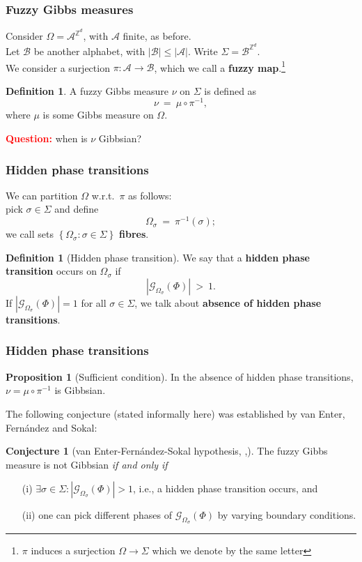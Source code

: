 \documentclass{beamer}
\newcommand{\A}{\mathcal{A}}
\newcommand{\B}{\mathcal{B}}
\newcommand{\G}{\mathcal{G}}
\newcommand{\Z}{\mathbb{Z}}
\newcommand{\set}[1]{\left\{#1\right\}}
\newcommand{\ra}{\rightarrow}
\newcommand{\1}{\mathbbm{1}}
\newcommand{\5}{\vspace{0.5cm}}
\newcommand{\3}{\vspace{0.3cm}}
\theoremstyle{definition}
\newtheorem{prop}[thm]{Proposition}
\newtheorem{df}[thm]{Definition}
\newtheorem*{conj}{Conjecture}
\begin{document}
\begin{frame}
\frametitle{Fuzzy Gibbs measures}
Consider $\Omega=\A^{\Z^d}$, with $\A$ finite, as before. \\\vspace{0.5cm}
Let $\B$ be another alphabet, with $|\B|\leq|\A|$. Write $\Sigma=\B^{\Z^d}$. \\\vspace{0.5cm}
We consider a surjection $\pi:\A\ra\B$, which we call a \textbf{fuzzy map}.\footnote{$\pi$ induces a surjection $\Omega\ra\Sigma$ which we denote by the same letter}
\begin{df}
A fuzzy Gibbs measure $\nu$ on $\Sigma$ is defined as
$$\nu ~=~ \mu\circ\pi^{-1},$$
where $\mu$ is some Gibbs measure on $\Omega$.
\end{df}\vspace{0.2cm}
\textcolor{red}{\textbf{Question:}} when is $\nu$ Gibbsian?
\end{frame}


\begin{frame}
\frametitle{Hidden phase transitions}
We can partition $\Omega$ w.r.t.~$\pi$ as follows:\\\vspace{0.3cm}
pick $\sigma\in\Sigma$ and define
$$\Omega_\sigma ~=~ \pi^{-1}(\sigma);$$
we call sets $\set{\Omega_\sigma:\sigma\in\Sigma}$ \textbf{fibres}.
\begin{df}[Hidden phase transition]
We say that a \textbf{hidden phase transition} occurs on $\Omega_\sigma$ if
$$|\G_{\Omega_\sigma}(\Phi)| ~>~ 1.$$
If $|\G_{\Omega_\sigma}(\Phi)|=1$ for all $\sigma\in\Sigma$, we talk about \textbf{absence of hidden phase transitions}.

\end{df}
\end{frame}

\begin{frame}
\frametitle{Hidden phase transitions}
\begin{prop}[Sufficient condition]
In the absence of hidden phase transitions, $\nu=\mu\circ\pi^{-1}$ is Gibbsian.
\end{prop}\vspace{0.3cm}
The following conjecture (stated informally here) was established by van Enter, Fern\'andez and Sokal:
\begin{conj}[van Enter-Fern\'andez-Sokal hypothesis, \cite{EFS},\cite{Ber}]
The fuzzy Gibbs measure is not Gibbsian \textit{if and only if}
\begin{itemize}
	\item[(i)] $\exists\sigma\in\Sigma:|\G_{\Omega_\sigma}(\Phi)|>1$, i.e., a hidden phase transition occurs, and
	\item[(ii)] one can pick different phases of $\G_{\Omega_\sigma}(\Phi)$ by varying boundary conditions.
\end{itemize}
\end{conj}
\end{frame}
\end{document}
